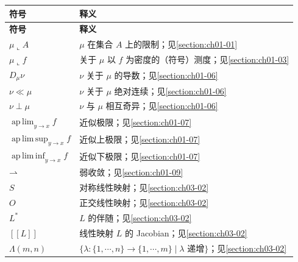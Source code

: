 \documentclass[../../main.tex]{subfiles}%
\begin{document}
\begin{longtable}{@{}p{}p{}@{}}
\toprule
\textbf{符号} & \textbf{释义} \\
\midrule
\endfirsthead
\toprule
\textbf{符号} & \textbf{释义} \\
\midrule
\endhead
$\mu\llcorner A$ & $\mu$ 在集合 $A$ 上的限制；见\cref{section:ch01-01} \\%
$\mu\llcorner f$ & 关于 $\mu$ 以 $f$ 为密度的（符号）测度；见\cref{section:ch01-03} \\%
$D_\mu\nu$ & $\nu$ 关于 $\mu$ 的导数；见\cref{section:ch01-06} \\%
$\nu\ll\mu$ & $\nu$ 关于 $\mu$ 绝对连续；见\cref{section:ch01-06} \\%
$\nu\perp\mu$ & $\nu$ 与 $\mu$ 相互奇异；见\cref{section:ch01-06} \\%
$\operatorname*{ap\,lim}_{y\to x}f$ & 近似极限；见\cref{section:ch01-07} \\%
$\operatorname*{ap\,lim\,sup}_{y\to x}f$ & 近似上极限；见\cref{section:ch01-07} \\%
$\operatorname*{ap\,lim\,inf}_{y\to x}f$ & 近似下极限；见\cref{section:ch01-07} \\%
$\rightharpoonup$ & 弱收敛；见\cref{section:ch01-09} \\%
$S$ & 对称线性映射；见\cref{section:ch03-02} \\%
$O$ & 正交线性映射；见\cref{section:ch03-02} \\%
$L^*$ & $L$ 的伴随；见\cref{section:ch03-02} \\%
$[\![L]\!]$ & 线性映射 $L$ 的 Jacobian；见\cref{section:ch03-02} \\%
$\Lambda(m,n)$ & $\{\lambda:\{1,\cdots,n\}\to\{1,\cdots,m\}\mid\lambda$ 递增$\}$；见\cref{section:ch03-02} \\%

\end{longtable}
\end{document}
